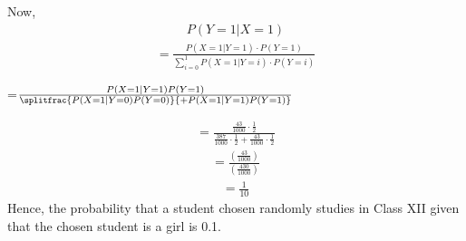 \documentclass[journal,12pt,two column]{IEEEtran}
\begin{document}
Now,
\begin{align}
P(Y=1 \vert X=1)    
\end{align}
\begin{align}    
=\frac{P(X=1\vert Y=1)\cdot P(Y=1)}{\sum_{i=0}^{1} P(X=1\vert Y=i)\cdot P(Y=i)}
\end{align}
\begin{center} 
=$\frac{P(X=1 \vert Y=1)P(Y=1)}{\splitfrac{P(X=1\vert Y=0)P(Y=0)}{+P(X=1\vert Y=1)P(Y=1)}}$
\end{center}
\begin{align}
=\frac{\frac{43}{1000}\cdot \frac{1}{2}}{\frac{387}{1000}\cdot \frac{1}{2} + \frac{43}{1000}\cdot \frac{1}{2}} 
\end{align}
\begin{align}
=\frac{(\frac{43}{1000})}{(\frac{430}{1000})}    
\end{align}
\begin{align}
=\frac{1}{10}    
\end{align}
Hence, the probability that a student chosen randomly studies in Class XII given that the chosen student is a girl is 0.1.
\end{document}
